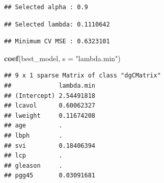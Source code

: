 \documentclass[
  11pt,
]{article}
\newenvironment{Shaded}{\begin{snugshade}}{\end{snugshade}}
\newcommand{\AttributeTok}[1]{\textcolor[rgb]{0.13,0.29,0.53}{#1}}
\newcommand{\FunctionTok}[1]{\textcolor[rgb]{0.13,0.29,0.53}{\textbf{#1}}}
\newcommand{\NormalTok}[1]{#1}
\newcommand{\SpecialCharTok}[1]{\textcolor[rgb]{0.81,0.36,0.00}{\textbf{#1}}}
\newcommand{\StringTok}[1]{\textcolor[rgb]{0.31,0.60,0.02}{#1}}
\begin{document}
\begin{verbatim}
## Selected alpha : 0.9
\end{verbatim}

\begin{Shaded}
\end{Shaded}

\begin{verbatim}
## Selected lambda: 0.1110642
\end{verbatim}

\begin{Shaded}
\end{Shaded}

\begin{verbatim}
## Minimum CV MSE : 0.6323101
\end{verbatim}

\begin{Shaded}
\begin{Highlighting}[]
\FunctionTok{coef}\NormalTok{(best\_model, }\AttributeTok{s =} \StringTok{"lambda.min"}\NormalTok{)}
\end{Highlighting}
\end{Shaded}

\begin{verbatim}
## 9 x 1 sparse Matrix of class "dgCMatrix"
##             lambda.min
## (Intercept) 2.54491818
## lcavol      0.60062327
## lweight     0.11674208
## age         .         
## lbph        .         
## svi         0.18406394
## lcp         .         
## gleason     .         
## pgg45       0.03091681
\end{verbatim}
\end{document}

